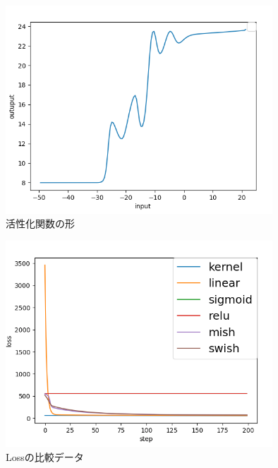 \begin{figure}[hbtp]
    \begin{center}
        \includegraphics[width=10cm]{asset/boston_0000001_SGDkaiming_normal__non_200_function_2.png}
            \caption{活性化関数の形}
            \label{boston}
    \end{center}
\end{figure}


\begin{figure}[hbtp]
    \begin{center}
        \includegraphics[width=10cm]{asset/boston_0000001_SGDkaiming_normal__non_200.png}
            \caption{Lossの比較データ}
            \label{boston}
    \end{center}
\end{figure}



